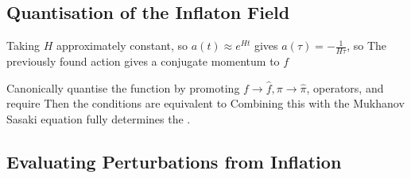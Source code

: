 \documentclass{article}
\begin{document}
\subsection{Quantisation of the Inflaton Field}

Taking $H$ approximately constant, so $a(t) \approx e^{Ht}$ gives $a(\tau) = - \frac{1}{H\tau}$, so 
The previously found action gives a conjugate momentum to $f$ 

Canonically quantise the function by promoting $ f \to \hat{f}, \pi \to \hat{\pi}$, operators, and require 
Then the conditions
are equivalent to 
Combining this with the Mukhanov Sasaki equation fully determines 
the . 


\subsection{Evaluating Perturbations from Inflation}
\end{document}
